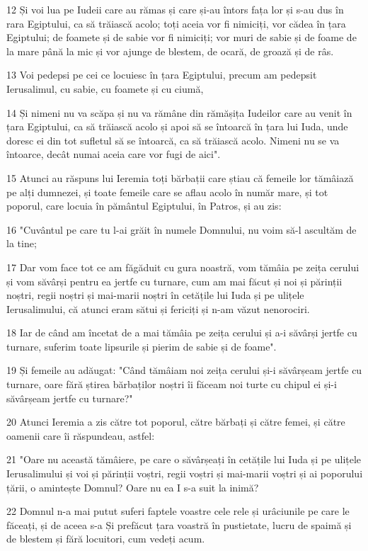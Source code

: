 \par 12 Și voi lua pe Iudeii care au rămas și care și-au întors fața lor și s-au dus în rara Egiptului, ca să trăiască acolo; toți aceia vor fi nimiciți, vor cădea în țara Egiptului; de foamete și de sabie vor fi nimiciți; vor muri de sabie și de foame de la mare până la mic și vor ajunge de blestem, de ocară, de groază și de râs.
\par 13 Voi pedepsi pe cei ce locuiesc în țara Egiptului, precum am pedepsit Ierusalimul, cu sabie, cu foamete și cu ciumă,
\par 14 Și nimeni nu va scăpa și nu va rămâne din rămășița Iudeilor care au venit în țara Egiptului, ca să trăiască acolo și apoi să se întoarcă în țara lui Iuda, unde doresc ei din tot sufletul să se întoarcă, ca să trăiască acolo. Nimeni nu se va întoarce, decât numai aceia care vor fugi de aici".
\par 15 Atunci au răspuns lui Ieremia toți bărbații care știau că femeile lor tămâiază pe alți dumnezei, și toate femeile care se aflau acolo în număr mare, și tot poporul, care locuia în pământul Egiptului, în Patros, și au zis:
\par 16 "Cuvântul pe care tu l-ai grăit în numele Domnului, nu voim să-l ascultăm de la tine;
\par 17 Dar vom face tot ce am făgăduit cu gura noastră, vom tămâia pe zeița cerului și vom săvârși pentru ea jertfe cu turnare, cum am mai făcut și noi și părinții noștri, regii noștri și mai-marii noștri în cetățile lui Iuda și pe ulițele Ierusalimului, că atunci eram sătui și fericiți și n-am văzut nenorociri.
\par 18 Iar de când am încetat de a mai tămâia pe zeița cerului și a-i săvârși jertfe cu turnare, suferim toate lipsurile și pierim de sabie și de foame".
\par 19 Și femeile au adăugat: "Când tămâiam noi zeița cerului și-i săvârșeam jertfe cu turnare, oare fără știrea bărbaților noștri îi făceam noi turte cu chipul ei și-i săvârșeam jertfe cu turnare?"
\par 20 Atunci Ieremia a zis către tot poporul, către bărbați și către femei, și către oamenii care îi răspundeau, astfel:
\par 21 "Oare nu această tămâiere, pe care o săvârșeați în cetățile lui Iuda și pe ulițele Ierusalimului și voi și părinții voștri, regii voștri și mai-marii voștri și ai poporului țării, o amintește Domnul? Oare nu ea I s-a suit la inimă?
\par 22 Domnul n-a mai putut suferi faptele voastre cele rele și urâciunile pe care le făceați, și de aceea s-a Și prefăcut țara voastră în pustietate, lucru de spaimă și de blestem și fără locuitori, cum vedeți acum.
